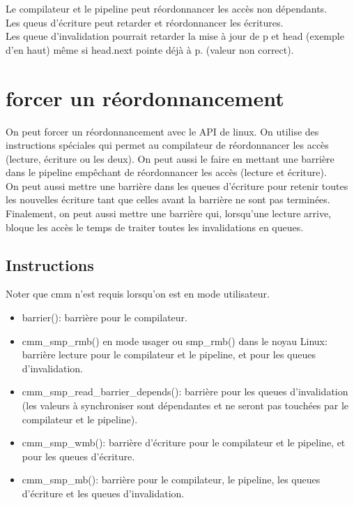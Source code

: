 \documentclass[oneside]{book}
\begin{document}
Le compilateur et le pipeline peut réordonnancer les accès non dépendants.\\
Les queus d'écriture peut retarder et réordonnancer les écritures.\\
Les queue d'invalidation pourrait retarder la mise à jour de p et head (exemple d'en haut) même si head.next pointe déjà à p. (valeur non correct).

\section{forcer un réordonnancement}

On peut forcer un réordonnancement avec le API de linux. On utilise des instructions spéciales qui permet au compilateur de réordonnancer les accès (lecture, écriture ou les deux). On peut aussi le faire en mettant une  barrière dans le pipeline empêchant de réordonnancer les accès (lecture et écriture).\\

On peut aussi mettre une barrière dans les queues d'écriture pour retenir toutes les nouvelles écriture tant que celles avant la barrière ne sont pas terminées.\\

Finalement, on peut aussi mettre une barrière qui, lorsqu'une lecture arrive, bloque les accès le temps de traiter toutes les invalidations en queues.
\subsection{Instructions}
Noter que cmm n'est requis lorsqu'on est en mode utilisateur.
\begin{itemize}
\item barrier(): barrière pour le compilateur.
\item cmm\_smp\_rmb() en mode usager ou smp\_rmb() dans le noyau
Linux: barrière lecture pour le compilateur et le pipeline, et pour les
queues d'invalidation.

\item cmm\_smp\_read\_barrier\_depends(): barrière pour les queues
d'invalidation (les valeurs à synchroniser sont dépendantes et ne
seront pas touchées par le compilateur et le pipeline).

\item cmm\_smp\_wmb(): barrière d'écriture pour le compilateur et le
pipeline, et pour les queues d'écriture.
\item cmm\_smp\_mb(): barrière pour le compilateur, le pipeline, les
queues d'écriture et les queues d'invalidation.
\end{itemize}
\end{document}
